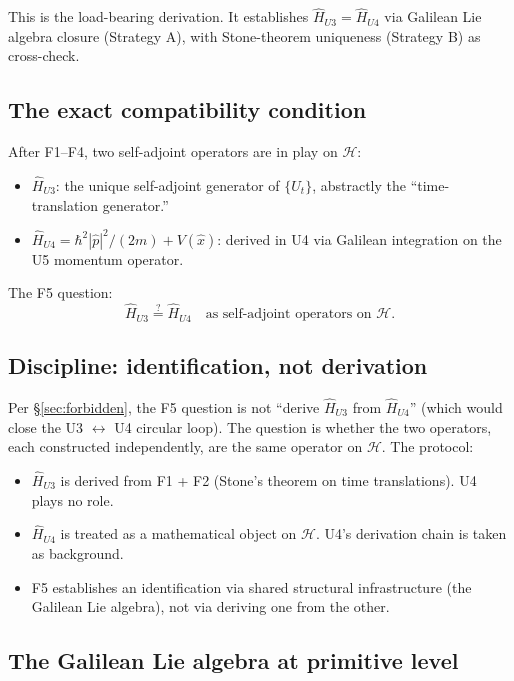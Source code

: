 \documentclass[11pt,a4paper]{article}
\begin{document}
This is the load-bearing derivation. It establishes $\hat{H}_{U3} = \hat{H}_{U4}$ via Galilean Lie algebra closure (Strategy A), with Stone-theorem uniqueness (Strategy B) as cross-check.

\subsection{The exact compatibility condition}

After F1--F4, two self-adjoint operators are in play on $\mathcal{H}$:

\begin{itemize}
  \item $\hat{H}_{U3}$: the unique self-adjoint generator of $\{U_t\}$, abstractly the ``time-translation generator.''
  \item $\hat{H}_{U4} = \hbar^2|\hat{p}|^2/(2m) + V(\hat{x})$: derived in U4 via Galilean integration on the U5 momentum operator.
\end{itemize}

The F5 question:
\begin{equation}
\hat{H}_{U3} \stackrel{?}{=} \hat{H}_{U4} \quad \text{as self-adjoint operators on } \mathcal{H}. \label{eq:F5-question}
\end{equation}

\subsection{Discipline: identification, not derivation}

Per \S\ref{sec:forbidden}, the F5 question is not ``derive $\hat{H}_{U3}$ from $\hat{H}_{U4}$'' (which would close the U3 $\leftrightarrow$ U4 circular loop). The question is whether the two operators, each constructed independently, are the same operator on $\mathcal{H}$. The protocol:

\begin{itemize}
  \item $\hat{H}_{U3}$ is derived from F1 + F2 (Stone's theorem on time translations). U4 plays no role.
  \item $\hat{H}_{U4}$ is treated as a mathematical object on $\mathcal{H}$. U4's derivation chain is taken as background.
  \item F5 establishes an identification via shared structural infrastructure (the Galilean Lie algebra), not via deriving one from the other.
\end{itemize}

\subsection{The Galilean Lie algebra at primitive level}
\end{document}
